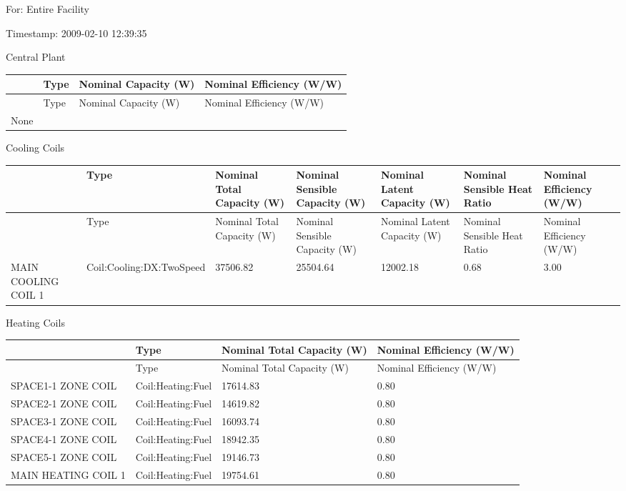 For: Entire Facility

Timestamp: 2009-02-10 12:39:35

Central Plant

\begin{longtable}[c]{@{}llll@{}}
\toprule
~ & Type & Nominal Capacity (W) & Nominal Efficiency (W/W) \tabularnewline
\midrule
\endfirsthead

\toprule
~ & Type & Nominal Capacity (W) & Nominal Efficiency (W/W) \tabularnewline
\midrule
\endhead

None & ~ & ~ & ~ \tabularnewline
\bottomrule
\end{longtable}

Cooling Coils

{\scriptsize
\begin{longtable}[c]{>{\raggedright}p{0.85in}>{\raggedright}p{0.85in}>{\raggedright}p{0.85in}>{\raggedright}p{0.85in}>{\raggedright}p{0.85in}>{\raggedright}p{0.85in}>{\raggedright}p{0.85in}}
\toprule
~ & Type & Nominal Total Capacity (W) & Nominal Sensible Capacity (W) & Nominal Latent Capacity (W) & Nominal Sensible Heat Ratio & Nominal Efficiency (W/W) \tabularnewline
\midrule
\endfirsthead

\toprule
~ & Type & Nominal Total Capacity (W) & Nominal Sensible Capacity (W) & Nominal Latent Capacity (W) & Nominal Sensible Heat Ratio & Nominal Efficiency (W/W) \tabularnewline
\midrule
\endhead

MAIN COOLING COIL 1 & Coil:\-Cooling:\-DX:\-TwoSpeed & 37506.82 & 25504.64 & 12002.18 & 0.68 & 3.00 \tabularnewline
\bottomrule
\end{longtable}}

Heating Coils

{\scriptsize
\begin{longtable}[c]{>{\raggedright}p{1.5in}>{\raggedright}p{1.5in}>{\raggedright}p{1.5in}>{\raggedright}p{1.5in}}
\toprule
~ & Type & Nominal Total Capacity (W) & Nominal Efficiency (W/W) \tabularnewline
\midrule
\endfirsthead

\toprule
~ & Type & Nominal Total Capacity (W) & Nominal Efficiency (W/W) \tabularnewline
\midrule
\endhead

SPACE1-1 ZONE COIL & Coil:Heating:Fuel & 17614.83 & 0.80 \tabularnewline
SPACE2-1 ZONE COIL & Coil:Heating:Fuel & 14619.82 & 0.80 \tabularnewline
SPACE3-1 ZONE COIL & Coil:Heating:Fuel & 16093.74 & 0.80 \tabularnewline
SPACE4-1 ZONE COIL & Coil:Heating:Fuel & 18942.35 & 0.80 \tabularnewline
SPACE5-1 ZONE COIL & Coil:Heating:Fuel & 19146.73 & 0.80 \tabularnewline
MAIN HEATING COIL 1 & Coil:Heating:Fuel & 19754.61 & 0.80 \tabularnewline
\bottomrule
\end{longtable}}

